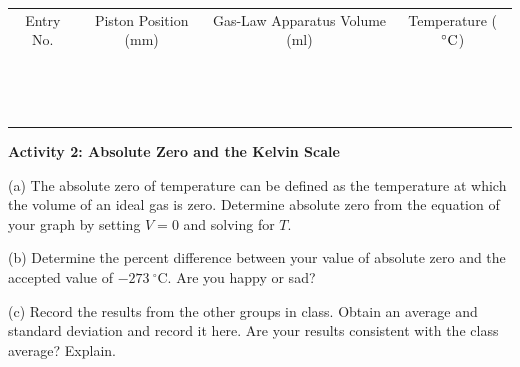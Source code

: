 \vspace{0.3cm}
\begin{center}
{\renewcommand{\arraystretch}{1.1}
\begin{tabular}{|c|c|c|c|}
\hline 
Entry No.&
Piston Position (mm)&
Gas-Law Apparatus Volume (ml)&
Temperature ($^\circ  \rm C$)\\
\hhline{|=|=|=|=|}
& & & \\
\hline 
& & & \\
\hline 
& & & \\
\hline 
& & & \\
\hline 
& & & \\
\hline 
& & & \\
\hline 
& & & \\
\hline 
& & & \\
\hline 
& & & \\
\hline 
& & & \\
\hline 
& & & \\
\hline 
& & & \\
\hline 
& & & \\
\hline 
& & & \\
\hline 
\end{tabular}\par}
\end{center}
\answerspace{20mm}


\textbf{Activity 2: Absolute Zero and the Kelvin Scale}

(a) The absolute zero of temperature can be defined as the temperature
at which the volume of an ideal gas is zero. Determine absolute
zero from the equation of your graph by setting $V = 0$ and solving for $T$.
\answerspace{30mm}

(b) Determine the percent difference between your value of absolute
zero and the accepted value of $-273~^{\circ }$C. Are you happy or sad?
\answerspace{30mm}

(c) Record the results from the other groups in class.
Obtain an average and standard deviation and record it here.
Are your results consistent with the class average? Explain.
\answerspace{10mm}
